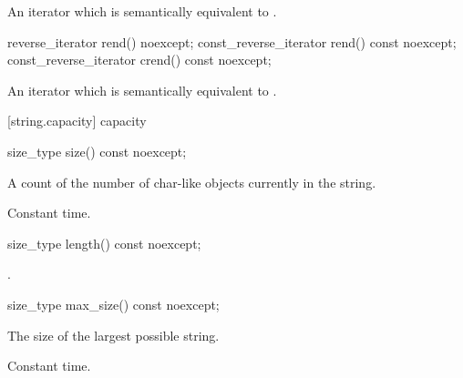 \begin{itemdescr}
\pnum
\returns
An iterator which is semantically equivalent to
.
\end{itemdescr}

%
%
%
%
\begin{itemdecl}
reverse_iterator       rend() noexcept;
const_reverse_iterator rend() const noexcept;
const_reverse_iterator crend() const noexcept;
\end{itemdecl}

\begin{itemdescr}
\pnum
\returns
An iterator which is semantically equivalent to
.
\end{itemdescr}

[string.capacity]{ capacity}

%
%
\begin{itemdecl}
size_type size() const noexcept;
\end{itemdecl}

\begin{itemdescr}
\pnum
\returns
A count of the number of char-like objects currently in the string.

\pnum
\complexity Constant time.
\end{itemdescr}

%
%
\begin{itemdecl}
size_type length() const noexcept;
\end{itemdecl}

\begin{itemdescr}
\pnum
\returns
{}.
\end{itemdescr}

%
%
\begin{itemdecl}
size_type max_size() const noexcept;
\end{itemdecl}

\begin{itemdescr}
\pnum
\returns
The size of the largest possible string.

\pnum
\complexity Constant time.
\end{itemdescr}

